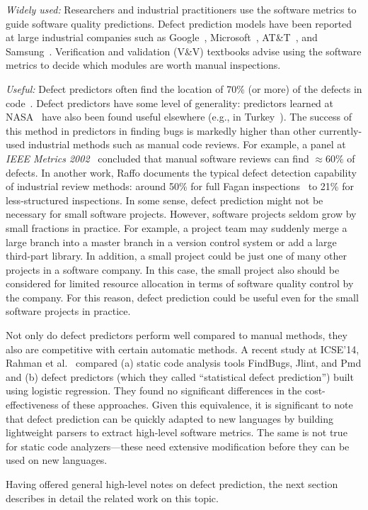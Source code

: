 {\em Widely used:}  Researchers and industrial practitioners  use the software metrics to guide software
quality predictions.
 Defect prediction models have been reported
  at large industrial companies such as Google~\cite{lewis13}, Microsoft~\cite{Nagappan06}, AT\&T~\cite{Ostrand05}, and Samsung~\cite{Kim15remi}.
Verification and validation (V\&V) textbooks
\cite{rakitin01} advise using the software metrics
to decide which modules are worth manual inspections.


{\em Useful:}
Defect predictors often  find the location of  70\% (or more)
of the defects in code~\cite{me07b}.
Defect predictors have some level of generality:
predictors learned at NASA~\cite{me07b} have also been found useful elsewhere
(e.g., in Turkey~\cite{tosun10,tosun09}).
The success of this method in  predictors in finding bugs is markedly
higher than other currently-used
industrial
methods such as manual code reviews. For example,
a  panel at {\em IEEE Metrics
2002}~\cite{shu02} concluded that manual software  reviews can find ${\approx}60\%$
of defects.
In another work,
Raffo documents the typical defect detection capability of
industrial review methods:   around 50\%
 for full Fagan inspections~\cite{fagan76} to
21\% for less-structured inspections.
In some sense, defect prediction might not be necessary for small software projects.
However, software projects seldom grow by small fractions in practice. For example, a project team may suddenly merge a large branch into a master branch in a version control system or add a large third-part library. In addition, a small project could be just one of many other projects in a software company. In this case, the small project also should be considered for limited resource allocation in terms of software quality control by the company. For this reason, defect prediction could be useful even for the small software projects in practice.

Not only do defect predictors perform well compared to manual methods,
they also are competitive with certain automatic methods.
A recent study at ICSE'14, Rahman et al.~\cite{rahman14:icse} compared
(a) static code analysis tools FindBugs, Jlint, and Pmd and (b) defect predictors
(which they called ``statistical defect prediction'') built using logistic regression.
They found  no significant differences in the cost-effectiveness
of these  approaches. Given this equivalence, it is significant to note that
defect prediction can be quickly adapted to new languages by building lightweight
parsers to extract high-level software metrics. The same is not true for static code analyzers---these need extensive modification before they can be used on new
languages.

Having offered general high-level notes on defect prediction,
the next section describes in detail the related work on this topic.
